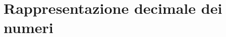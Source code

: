 \documentclass[onecolumn,11pt]{book}
\newcommand{\rpr}{\textsf{R}~}
\begin{document}

\section{Rappresentazione decimale dei numeri}
\end{document}
